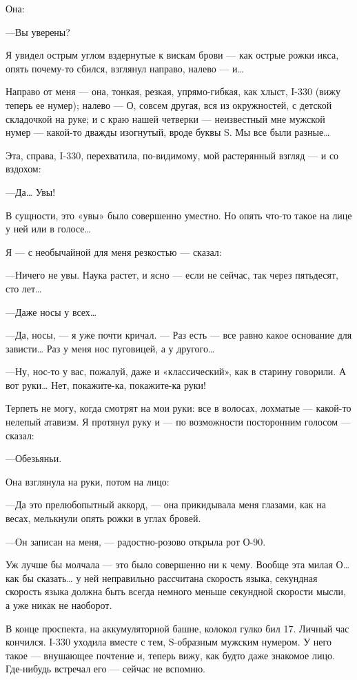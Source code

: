 \documentclass[11pt,openany]{book}
\begin{document}
Она:

---Вы уверены?

Я увидел острым углом вздернутые к вискам брови --- как острые рожки икса, опять почему-то сбился, взглянул направо, налево --- и\ldots{}

Направо от меня --- она, тонкая, резкая, упрямо-гибкая, как хлыст, I-330 (вижу теперь ее нумер); налево --- О, совсем другая, вся из окружностей, с детской складочкой на руке; и с краю нашей четверки --- неизвестный мне мужской нумер --- какой-то дважды изогнутый, вроде буквы S. Мы все были разные\ldots{}

Эта, справа, I-330, перехватила, по-видимому, мой растерянный взгляд --- и со вздохом:

---Да\ldots{} Увы!

В сущности, это «увы» было совершенно уместно. Но опять что-то такое на лице у ней или в голосе\ldots{}

Я --- с необычайной для меня резкостью --- сказал:

---Ничего не увы. Наука растет, и ясно --- если не сейчас, так через пятьдесят, сто лет\ldots{}

---Даже носы у всех\ldots{}

---Да, носы, --- я уже почти кричал. --- Раз есть --- все равно какое основание для зависти\ldots{} Раз у меня нос пуговицей, а у другого\ldots{}

---Ну, нос-то у вас, пожалуй, даже и «классический», как в старину говорили. А вот руки\ldots{} Нет, покажите-ка, покажите-ка руки!

Терпеть не могу, когда смотрят на мои руки: все в волосах, лохматые --- какой-то нелепый атавизм. Я протянул руку и --- по возможности посторонним голосом --- сказал:

---Обезьяньи.

Она взглянула на руки, потом на лицо:

---Да это прелюбопытный аккорд, --- она прикидывала меня глазами, как на весах, мелькнули опять рожки в углах бровей.

---Он записан на меня, --- радостно-розово открыла рот О-90.

Уж лучше бы молчала --- это было совершенно ни к чему. Вообще эта милая О\ldots{} как бы сказать\ldots{} у ней неправильно рассчитана скорость языка, секундная скорость языка должна быть всегда немного меньше секундной скорости мысли, а уже никак не наоборот.

В конце проспекта, на аккумуляторной башне, колокол гулко бил 17. Личный час кончился. I-330 уходила вместе с тем, S-образным мужским нумером. У него такое --- внушающее почтение и, теперь вижу, как будто даже знакомое лицо. Где-нибудь встречал его --- сейчас не вспомню.
\end{document}
